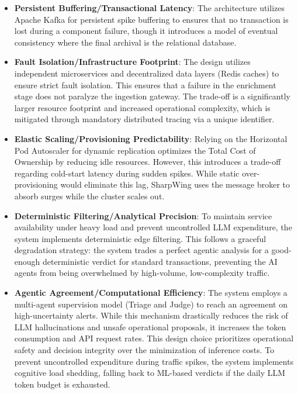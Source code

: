 \documentclass[12pt]{report}
\begin{document}
\begin{itemize}
    \item \textbf{Persistent Buffering/Transactional Latency}: The architecture utilizes Apache Kafka for persistent spike buffering to ensures that no transaction is lost during a component failure, though it introduces a model of eventual consistency where the final archival is the relational database.

    \item \textbf{Fault Isolation/Infrastructure Footprint}: The design utilizes independent microservices and decentralized data layers (Redis caches) to ensure strict fault isolation. This ensures that a failure in the enrichment stage does not paralyze the ingestion gateway. The trade-off is a significantly larger resource footprint and increased operational complexity, which is mitigated through mandatory distributed tracing via a unique identifier.
    
    \item \textbf{Elastic Scaling/Provisioning Predictability}: Relying on the Horizontal Pod Autoscaler for dynamic replication optimizes the Total Cost of Ownership by reducing idle resources. However, this introduces a trade-off regarding cold-start latency during sudden spikes. While static over-provisioning would eliminate this lag, SharpWing uses the message broker to absorb surges while the cluster scales out.

    \item \textbf{Deterministic Filtering/Analytical Precision}: To maintain service availability under heavy load and prevent uncontrolled LLM expenditure, the system implements deterministic edge filtering. This follows a graceful degradation strategy: the system trades a perfect agentic analysis for a good-enough deterministic verdict for standard transactions, preventing the AI agents from being overwhelmed by high-volume, low-complexity traffic.

    \item \textbf{Agentic Agreement/Computational Efficiency}: The system employs a multi-agent supervision model (Triage and Judge) to reach an agreement on high-uncertainty alerts. While this mechanism drastically reduces the risk of LLM hallucinations and unsafe operational proposals, it increases the token consumption and API request rates. This design choice prioritizes operational safety and decision integrity over the minimization of inference costs. To prevent uncontrolled expenditure during traffic spikes, the system implements cognitive load shedding, falling back to ML-based verdicts if the daily LLM token budget is exhausted.
\end{itemize}
\end{document}
